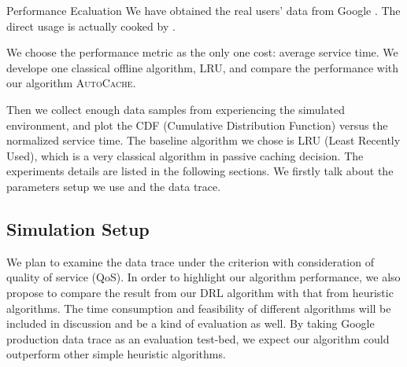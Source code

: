 \documentclass{article}
\begin{document}
\begin{section}{Performance Ecaluation}
    \label{exp}
    We have obtained the real users' data from Google \cite{clusterdata:Reiss2011}. The direct usage is actually cooked by \cite{Pensieve}.

    We choose the performance metric as the only one cost: average service time. We develope one classical offline algorithm, LRU, and compare the performance with our algorithm \textsc{AutoCache}.
    
    Then we collect enough data samples from experiencing the simulated environment, and plot the CDF (Cumulative Distribution Function) versus the normalized service time.
    The baseline algorithm we chose is LRU (Least Recently Used), which is a very classical algorithm in passive caching decision.
    The experiments details are listed in the following sections. We firstly talk about the parameters setup we use and the data trace.

    \subsection{Simulation Setup}
     We plan to examine the data trace under the criterion with consideration of quality of service (QoS). In order to highlight our algorithm performance, we also propose to compare the result from our DRL algorithm with that from heuristic algorithms. The time consumption and feasibility of different algorithms will be included in discussion and be a kind of evaluation as well. By taking Google production data trace as an evaluation test-bed, we expect our algorithm could outperform other simple heuristic algorithms.


\end{section}
\end{document}
